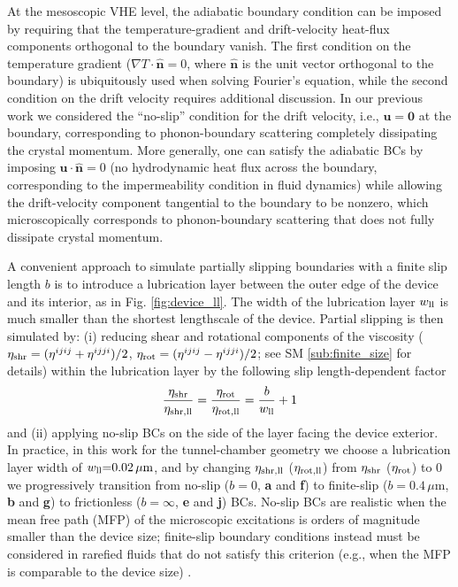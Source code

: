 \documentclass[
prb,
twocolumn,
superscriptaddress,
 amsmath,amssymb,
 aps,
longbibliography,
]{revtex4-2}
\begin{document}
At the mesoscopic VHE level, the adiabatic boundary condition can be imposed by requiring that the temperature-gradient and drift-velocity heat-flux components orthogonal to the boundary vanish. The first condition on the temperature gradient ($\nabla T\cdot \bm{\hat n}=0$, where $\bm{\hat n}$ is the unit vector orthogonal to the boundary) is ubiquitously used when solving Fourier’s equation, while the second condition on the drift velocity requires additional discussion.
In our previous work \cite{Simoncelli2020} we considered the ``no-slip'' condition for the drift velocity, i.e., $\bm{u}=\bm{0}$ at the boundary, corresponding to phonon-boundary scattering completely dissipating the crystal momentum.
More generally, one can satisfy the adiabatic BCs by imposing $\bm{u}\cdot \bm{\hat n}=0$ (no hydrodynamic heat flux across the boundary, corresponding to the impermeability condition in fluid dynamics) while allowing the drift-velocity component tangential to the boundary to be nonzero, which microscopically corresponds to phonon-boundary scattering that does not fully dissipate crystal momentum.

A convenient approach to simulate partially slipping boundaries with a finite slip length $b$ is to introduce a lubrication layer \cite{bocquetFlowBoundaryConditions2007} between the outer edge of the device and its interior, as in Fig. \ref{fig:device_ll}. The width of the lubrication layer $w_{\rm ll}$ is much smaller than the shortest lengthscale of the device. Partial slipping is then simulated by: (i) reducing shear and rotational components of the viscosity ($\eta_{\rm shr} = (\eta^{ijij}+\eta^{ijji})/2$, $\eta_{\rm rot} = (\eta^{ijij}-\eta^{ijji})/2$; see SM \ref{sub:finite_size} for details) within the lubrication layer by the following slip length-dependent factor \cite{bocquetFlowBoundaryConditions2007}
\begin{equation}
	\frac{\eta_{\rm shr}}{\eta_{\rm shr, ll}} = \frac{\eta_{\rm rot}}{\eta_{\rm rot, ll}} = \frac{b}{w_{\rm ll}} + 1
	\label{eq:slip_length}
\end{equation}
and (ii) applying no-slip BCs on the side of the layer facing the device exterior.
In practice, in this work for the tunnel-chamber geometry we choose a lubrication layer width of $w_{\rm ll}{=}0.02\,\mu\mathrm{m}$, and by changing $\eta_{\rm shr, ll}$ ($\eta_{\rm rot, ll}$) from $\eta_{\rm shr}$ ($\eta_{\rm rot}$) to 0 we progressively transition from no-slip ($b{=}0$, \textbf{a} and \textbf{f}) to finite-slip ($b{=}0.4\,\mu\mathrm{m}$, \textbf{b} and \textbf{g}) to frictionless ($b=\infty$, \textbf{e} and \textbf{j}) BCs.
No-slip BCs are realistic when the mean free path (MFP) of the microscopic excitations is orders of magnitude smaller than the device size; finite-slip boundary conditions instead must be considered in rarefied fluids that do not satisfy this criterion (e.g., when the MFP is comparable to the device size) \cite{laurentLargeVariationBoundaryCondition2011}.
\end{document}
